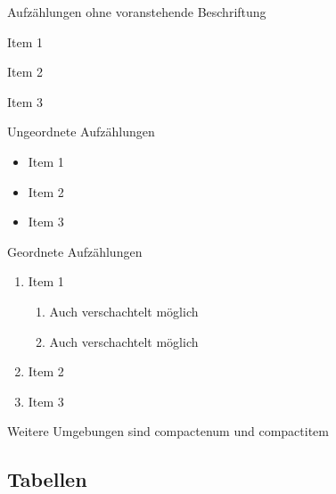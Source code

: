 \documentclass[\mainsize, a4paper, fleqn, xcolor=dvipsnames]{scrartcl}
\begin{document}
	Aufzählungen ohne voranstehende Beschriftung
	
	\begin{description}
		\item{Item 1}
		\item{Item 2}
		\item{Item 3}
	\end{description}
	
	Ungeordnete Aufzählungen
	
	\begin{itemize}
		\item{Item 1}
		\item{Item 2}
		\item{Item 3}
	\end{itemize}
	
	Geordnete Aufzählungen 
	
	\begin{enumerate} %
		\item{Item 1}
		\begin{enumerate}
			\item Auch verschachtelt möglich
			\item Auch verschachtelt möglich
		\end{enumerate}
		\item{Item 2}
		\item{Item 3}
	\end{enumerate}
	
	Weitere Umgebungen sind compactenum und compactitem
	
	\subsection{Tabellen}\label{subsec:tables}
	
	
	
\end{document}
